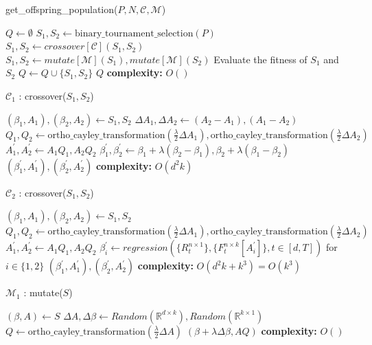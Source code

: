 \begin{algorithm}[H]
\caption{get\_offspring\_population($P,N,\mathcal{C},\mathcal{M}$)}\label{nsga2:generate_offspring_population}
\begin{algorithmic}[1]
\State $Q \gets \emptyset$
\State $S_1, S_2 \gets \text{binary\_tournament\_selection}(P)$ 
\State $S_1, S_2 \gets crossover[\mathcal{C}](S_1,S_2) $
\EndIf
{}
\State $S_1, S_2 \gets mutate[\mathcal{M}](S_1),mutate[\mathcal{M}](S_2) $
\EndIf
\State Evaluate the fitness of $S_1$ and $S_2$
\State $Q \gets Q \cup \{S_1, S_2\}$
\EndFor
\State \Return $Q$
\State \textbf{complexity: } $O()$
\end{algorithmic}
\end{algorithm}
\begin{algorithm}[H]
\caption{$\mathcal{C}_1$ : crossover($S_1,S_2$)}\label{nsga2:crossover_1}
\begin{algorithmic}[1]
\State $(\beta_1, A_1), (\beta_2, A_2)\gets S_1, S_2$
\State $\Delta A_1, \Delta A_2 \gets (A_2-A_1), (A_1-A_2)$
\State $Q_1, Q_2 \gets \text{ortho\_cayley\_transformation}(\frac{\lambda}{2} \Delta A_1), \text{ortho\_cayley\_transformation}(\frac{\lambda}{2} \Delta A_2)$
\State $A^{'}_1, A^{'}_2\gets A_1Q_1, A_2Q_2$
\State $\beta^{'}_1, \beta^{'}_2 \gets \beta_1 + \lambda(\beta_2-\beta_1), \beta_2 + \lambda(\beta_1-\beta_2)$
\State \Return $(\beta^{'}_1,A^{'}_1),(\beta^{'}_2,A^{'}_2)$
\State \textbf{complexity: } $O(d^2k)$
\end{algorithmic}
\end{algorithm}
\begin{algorithm}[H]
\caption{$\mathcal{C}_2$ : crossover($S_1,S_2$)}\label{nsga2:crossover_1}
\begin{algorithmic}[1]
\State $(\beta_1, A_1), (\beta_2, A_2)\gets S_1, S_2$
\State $Q_1, Q_2 \gets \text{ortho\_cayley\_transformation}(\frac{\lambda}{2} \Delta A_1), \text{ortho\_cayley\_transformation}(\frac{\lambda}{2} \Delta A_2)$
\State $A^{'}_1, A^{'}_2\gets A_1Q_1, A_2Q_2$
\State $\beta^{'}_i \gets regression(\{R^{n\times 1}_{t}\},\{F^{n\times k}_{t}[A^{'}_i]\}, t\in [d,T])$ for $i\in \{1,2\}$
\State \Return $(\beta^{'}_1,A^{'}_1),(\beta^{'}_2,A^{'}_2)$
\State \textbf{complexity: } $O(d^2k+k^3) = O(k^3)$
\end{algorithmic}
\end{algorithm}
\begin{algorithm}[H]
\caption{$\mathcal{M}_1$ : mutate($S$)}\label{nsga2:mutate_1}
\begin{algorithmic}[1]
\State $(\beta, A)\gets S$
\State $\Delta A, \Delta \beta \gets Random(\mathbb{R}^{d\times k}),Random(\mathbb{R}^{k\times 1})$
\State $Q \gets \text{ortho\_cayley\_transformation}(\frac{\lambda}{2} \Delta A)$
\State \Return $(\beta + \lambda \Delta \beta, AQ)$
\State \textbf{complexity: } $O()$
\end{algorithmic}
\end{algorithm}

